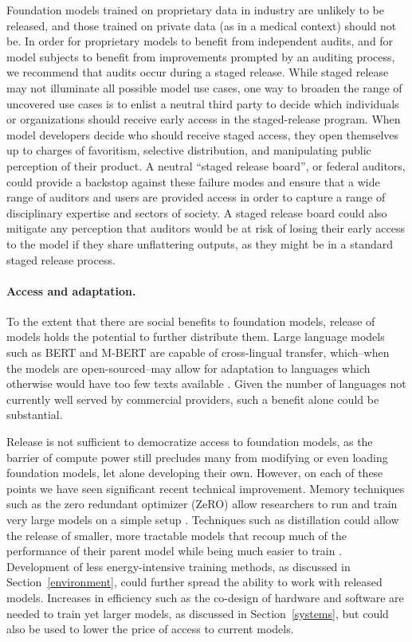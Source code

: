 Foundation models trained on proprietary data in industry are unlikely to be released, and those trained on private data (as in a medical context) should not be. In order for proprietary models to benefit from independent audits, and for model subjects to benefit from improvements prompted by an auditing process, we recommend that audits occur during a staged release.  While staged release may not illuminate all possible model use cases, one way to broaden the range of uncovered use cases is to enlist a neutral third party to decide which individuals or organizations should receive early access in the staged-release program. When model developers decide who should receive staged access, they open themselves up to charges of favoritism, selective distribution, and manipulating public perception of their product. A neutral “staged release board”, or federal auditors, could provide a backstop against these failure modes and ensure that a wide range of auditors and users are provided access in order to capture a range of disciplinary expertise and sectors of society. A staged release board could also mitigate any perception that auditors would be at risk of losing their early access to the model if they share unflattering outputs, as they might be in a standard staged release process. 

\paragraph{Access and adaptation.} 

To the extent that there are social benefits to foundation models, release of models holds the potential to further distribute them. Large language models such as BERT and M-BERT are capable of cross-lingual transfer, which--when the models are open-sourced--may allow for adaptation to languages which otherwise would have too few texts available \citep{wu-dredze-2019-beto, wang_extending_2020}. Given the number of languages not currently well served by commercial providers, such a benefit alone could be substantial.   

Release is not sufficient to democratize access to foundation models, as the barrier of compute power still precludes many from modifying or even loading foundation models, let alone developing their own. However, on each of these points we have seen significant recent technical  improvement. Memory techniques such as the zero redundant optimizer (ZeRO) allow researchers to run and train very large models on a simple setup \citep{rasley2020deepspeed, rajbhandari2021zeroinfinity}. Techniques such as distillation could allow the release of smaller, more tractable models that recoup much of the performance of their parent model while being much easier to train \citep{li2020train}. Development of less energy-intensive training methods, as discussed in Section~\ref{environment}, could further spread the ability to work with released models. Increases in efficiency such as the co-design of hardware and software are needed to train yet larger models, as discussed in Section~\ref{systems}, but could also be used to lower the price of access to current models.  

